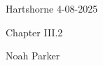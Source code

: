 \documentclass[12pt]{amsart}
\begin{document}
{Hartshorne} \hfill {4-08-2025}

\bigskip\bigskip

\begin{center}

{\sc Chapter III.2}

\end{center}

\begin{center}

  {Noah Parker} 
    
\end{center}

\bigskip\bigskip

% 
\end{document}

